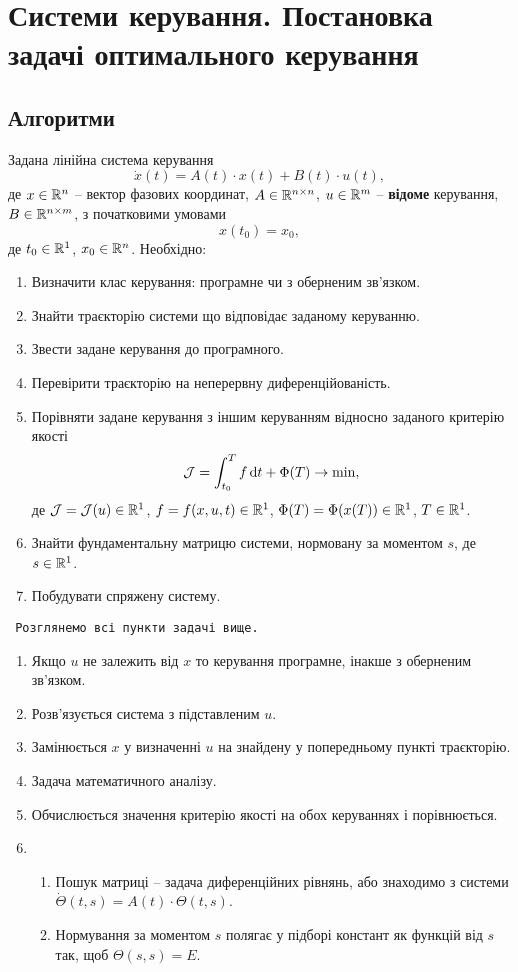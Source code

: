 \section{Системи керування. Постановка задачі оптимального керування}

\subsection{Алгоритми}

\begin{problem*}
	Задана лінійна система керування \[ \dot{x} (t) = A (t) \cdot x(t) + B(t) \cdot u(t),\] де $x \in \mathbb{R}^n$ -- вектор фазових координат, $A \in \mathbb{R}^{n\times n}$, $u \in \mathbb{R}^m$ -- \textbf{відоме} керування, $B \in \mathbb{R}^{n \times m}$, з початковими умовами \[ x(t_0) = x_0, \] де $t_0 \in \mathbb{R}^1$, $x_0 \in \mathbb{R}^n$. Необхідно:
	\begin{enumerate}
		\item Визначити клас керування: програмне чи з оберненим зв'язком.
		\item Знайти траєкторію системи що відповідає заданому керуванню.
		\item Звести задане керування до програмного.
		\item Перевірити траєкторію на неперервну диференційованість.
		\item Порівняти задане керування з іншим керуванням відносно заданого критерію якості \[\mathcal{J} = \int_{t_0}^T f \mathop{}\!\mathrm{d} t + \Phi(T) \to \min,\] де $\mathcal{J} = \mathcal{J}(u)\in\mathbb{R}^1$, $f=f(x,u,t)\in\mathbb{R}^1$, $\Phi(T)=\Phi(x(T))\in\mathbb{R}^1$, $T \in \mathbb{R}^1$.
		\item Знайти фундаментальну матрицю системи, нормовану за моментом $s$, де $s \in \mathbb{R}^1$.
		\item Побудувати спряжену систему.
	\end{enumerate}
\end{problem*}

\begin{algorithm} \tt
	Розглянемо всі пункти задачі вище.
	\begin{enumerate}
		\item Якщо $u$ не залежить від $x$ то керування програмне, інакше з о\-бер\-не\-ним зв'язком.
		\item Розв'язується система з підставленим $u$.
		\item Замінюється $x$ у визначенні $u$ на знайдену у попередньому пункті \allowbreak тра\-єк\-то\-рі\-ю.
		\item Задача математичного аналізу.
		\item Обчислюється значення критерію якості на обох керуваннях і по\-рів\-ню\-є\-ться.
		\item \begin{enumerate}
			\item Пошук матриці -- задача диференційних рівнянь, або знаходимо з системи $\dot \Theta(t,s) = A(t) \cdot \Theta(t,s)$.
			\item Нормування за моментом $s$ полягає у підборі констант як функ\-цій від $s$ так, щоб $\Theta(s,s)=E$.
		\end{enumerate} 
	\end{enumerate}
\end{algorithm}


